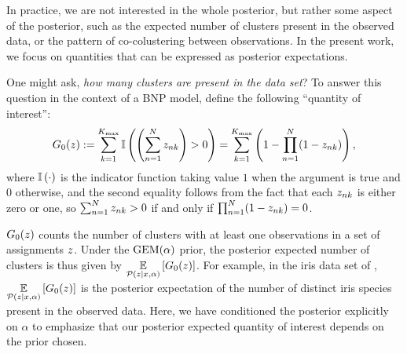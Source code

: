 In practice, we are not interested in the whole posterior, but rather some
aspect of the posterior, such as the expected number of clusters present in the
observed data, or the pattern of co-colustering between observations. In the
present work, we focus on quantities that can be expressed as posterior
expectations.


\begin{ex}

One might ask, \textit{how many clusters are present in the data set}? To answer
this question in the context of a BNP model, define the
following ``quantity of interest'':
%
\begin{align*}
  G_0(z) := \sum_{k=1}^{K_{\mathrm{max}}} \mathbb{I}\left( \left(\sum_{n=1}^{N}
  z_{nk}\right) > 0\right)
  = \sum_{k=1}^{{K_{\mathrm{max}}}} \left(1 -  \prod_{n=1}^N (1 - z_{nk})\right),
\end{align*}
%
where $\mathbb{I}\left(\cdot\right)$ is the indicator function taking value $1$ when the argument
is true and $0$ otherwise, and the second equality follows from the fact that
each $z_{nk}$ is either zero or one, so $\sum_{n=1}^N z_{nk} > 0$ if and
only if $\prod_{n=1}^N (1 - z_{nk}) = 0$.

$G_0(z)$ counts the number of clusters with at least one observations
in a set of assignments $z$.  Under the $\mathrm{GEM}(\alpha)$ prior, the posterior expected
number of clusters is thus given by
$\underset{\mathcal{P}(z\vert x,\alpha)}{\mathbb{E}}\left[G_0(z)\right]$. For example, in the iris data
set of ,
$\underset{\mathcal{P}(z\vert x,\alpha)}{\mathbb{E}}\left[G_0(z)\right]$ is the posterior expectation
of the number of distinct iris species present in the observed data.  Here, we
have conditioned the posterior explicitly on $\alpha$ to emphasize that our
posterior expected quantity of interest depends on the prior chosen.
%
%
\end{ex}

